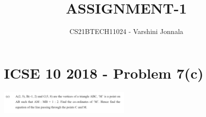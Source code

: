 \documentclass[journal,12pt,twocolumn]{IEEEtran}
\DeclareMathOperator*{\Res}{Res}
\begin{document}
\newcommand{\BEQA}{\begin{eqnarray}}
\newcommand{\EEQA}{\end{eqnarray}}
\newcommand{\define}{\stackrel{\triangle}{=}}

\raggedbottom

\newtheorem{rem}{Remark}
\newcommand{\sgn}{\mathop{\mathrm{sgn}}}
\providecommand{\abs}[1]{\vert#1\vert}
\providecommand{\res}[1]{\Res\displaylimits_{#1}} 
\providecommand{\norm}[1]{\lVert#1\rVert}

\providecommand{\mtx}[1]{\mathbf{#1}}
\providecommand{\mean}[1]{E[ #1 ]}
\providecommand{\fourier}{\overset{\mathcal{F}}{ \rightleftharpoons}}

\newcommand{\solution}{\noindent \textbf{Solution: }}
\providecommand{\dec}[2]{\ensuremath{\overset{#1}{\underset{#2}{\gtrless}}}}
\newcommand{\myvec}[1]{\ensuremath{\begin{pmatrix}#1\end{pmatrix}}}
\newcommand{\mydet}[1]{\ensuremath{\begin{vmatrix}#1\end{vmatrix}}}
\makeatletter
{}
\makeatother
\let\StandardTheFigure\thefigure
\let\vec\mathbf
\renewcommand{\thefigure}{\theproblem}
\def\putbox#1#2#3{\makebox[0in][l]{\makebox[#1][l]{}\raisebox{\baselineskip}[0in][0in]{\raisebox{#2}[0in][0in]{#3}}}}
     \def\rightbox#1{\makebox[0in][r]{#1}}
     \def\centbox#1{\makebox[0in]{#1}}
     \def\topbox#1{\raisebox{-\baselineskip}[0in][0in]{#1}}
     \def\midbox#1{\raisebox{-0.5\baselineskip}[0in][0in]{#1}}
\vspace{3cm}
\title{
   ASSIGNMENT-1
}
\author{CS21BTECH11024 - Varshini  Jonnala}	

\maketitle

\bigskip
\renewcommand{\thefigure}{\theenumi}
\renewcommand{\thetable}{\theenumi}

\section*{ICSE 10 2018 - Problem 7(c)}

\begin{center}
    \includegraphics[width=0.49\textwidth]{prv1a.png}
\end{center}
\end{document}
